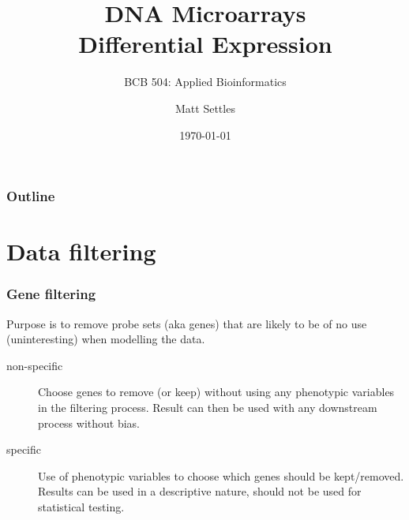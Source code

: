 \documentclass[pdf]{beamer}
\begin{document}
\title[Differential Expression]{DNA Microarrays\\Differential Expression\\}
\subtitle{BCB 504: Applied Bioinformatics\\}
\author[Matt Settles]{Matt Settles}
\date{\today}


\begin{frame}[plain]
  \titlepage
\end{frame}


\begin{frame}[plain] 
  \frametitle{Outline}
  \tableofcontents
\end{frame}

\section{Data filtering}

\begin{frame}
  \frametitle{Gene filtering}
  Purpose is to remove probe sets (aka genes) that are likely to be of no use (uninteresting) when modelling the data.
  \begin{description}
  \item[non-specific] Choose genes to remove (or keep) without using any phenotypic variables in the filtering process. Result can then be used with any downstream process without bias.
  \item[specific] Use of phenotypic variables to choose which genes should be kept/removed. Results can be used in a descriptive nature, should not be used for statistical testing.
 \end{description}
\end{frame}
\end{document}
